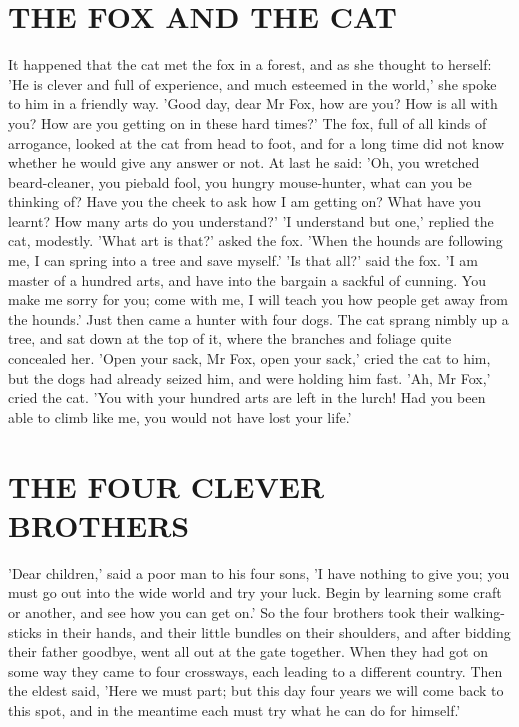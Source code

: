 \documentclass[12pt]{book}
\begin{document}
\chapter{THE FOX AND THE CAT}

It happened that the cat met the fox in a forest, and as she thought
to herself: 'He is clever and full of experience, and much esteemed in
the world,' she spoke to him in a friendly way. 'Good day, dear Mr
Fox, how are you? How is all with you? How are you getting on in these
hard times?' The fox, full of all kinds of arrogance, looked at the
cat from head to foot, and for a long time did not know whether he
would give any answer or not. At last he said: 'Oh, you wretched
beard-cleaner, you piebald fool, you hungry mouse-hunter, what can you
be thinking of? Have you the cheek to ask how I am getting on? What
have you learnt? How many arts do you understand?' 'I understand but
one,' replied the cat, modestly. 'What art is that?' asked the fox.
'When the hounds are following me, I can spring into a tree and save
myself.' 'Is that all?' said the fox. 'I am master of a hundred arts,
and have into the bargain a sackful of cunning. You make me sorry for
you; come with me, I will teach you how people get away from the
hounds.' Just then came a hunter with four dogs. The cat sprang nimbly
up a tree, and sat down at the top of it, where the branches and
foliage quite concealed her. 'Open your sack, Mr Fox, open your sack,'
cried the cat to him, but the dogs had already seized him, and were
holding him fast. 'Ah, Mr Fox,' cried the cat. 'You with your hundred
arts are left in the lurch! Had you been able to climb like me, you
would not have lost your life.'



\chapter{THE FOUR CLEVER BROTHERS}

'Dear children,' said a poor man to his four sons, 'I have nothing to
give you; you must go out into the wide world and try your luck. Begin
by learning some craft or another, and see how you can get on.' So the
four brothers took their walking-sticks in their hands, and their
little bundles on their shoulders, and after bidding their father
goodbye, went all out at the gate together. When they had got on some
way they came to four crossways, each leading to a different country.
Then the eldest said, 'Here we must part; but this day four years we
will come back to this spot, and in the meantime each must try what he
can do for himself.'
\end{document}

